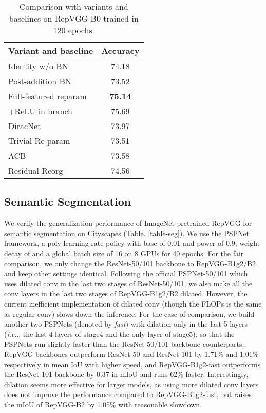 \documentclass[final]{cvpr}
\makeatletter
\DeclareRobustCommand\onedot{\futurelet\@let@token\@onedot}
\def\@onedot{\ifx\@let@token.\else.\null\fi\xspace}
\def\ie{\emph{i.e}\onedot}
\makeatother
\begin{document}
\setlength{\tabcolsep}{4pt}
\begin{table}
	\caption{Comparison with variants and baselines on RepVGG-B0 trained in 120 epochs.}
	\label{table-variants}
	\vspace{-0.2in}
	\begin{center}
		\small
		\begin{tabular}{lc}
			\hline
			Variant and baseline&	Accuracy		\\
			\hline
			Identity w/o BN		&	74.18			\\
			Post-addition BN				&	73.52			\\
			Full-featured reparam	&	\textbf{75.14}	\\
			+ReLU in branch 	&	75.69			\\
			\hline
			DiracNet \cite{zagoruyko2017diracnets}			&	73.97			\\
			Trivial Re-param	&	73.51			\\
			ACB \cite{ding2019acnet}	&	73.58			\\
			Residual Reorg		&	74.56	\\
			\hline
		\end{tabular}
	\end{center}
	\vspace{-0.3in}
\end{table}
\setlength{\tabcolsep}{1.4pt}





\subsection{Semantic Segmentation}
We verify the generalization performance of ImageNet-pretrained RepVGG for semantic segmentation on Cityscapes \cite{cityscapes} (Table. \ref{table-seg}). We use the PSPNet \cite{pspnet} framework, a poly learning rate policy with base of 0.01 and power of 0.9, weight decay of  and a global batch size of 16 on 8 GPUs for 40 epochs. For the fair comparison, we only change the ResNet-50/101 backbone to RepVGG-B1g2/B2 and keep other settings identical. Following the official PSPNet-50/101 \cite{pspnet} which uses dilated conv in the last two stages of ResNet-50/101, we also make all the  conv layers in the last two stages of RepVGG-B1g2/B2 dilated. However, the current inefficient implementation of  dilated conv (though the FLOPs is the same as  regular conv) slows down the inference. For the ease of comparison, we build another two PSPNets (denoted by \textit{fast}) with dilation only in the last 5 layers (\ie, the last 4 layers of stage4 and the only layer of stage5), so that the PSPNets run slightly faster than the ResNet-50/101-backbone counterparts. RepVGG backbones outperform ResNet-50 and ResNet-101 by 1.71\% and 1.01\% respectively in mean IoU with higher speed, and RepVGG-B1g2-fast outperforms the ResNet-101 backbone by 0.37 in mIoU and runs 62\% faster. Interestingly, dilation seems more effective for larger models, as using more dilated conv layers does not improve the performance compared to RepVGG-B1g2-fast, but raises the mIoU of RepVGG-B2 by 1.05\% with reasonable slowdown.
\end{document}
